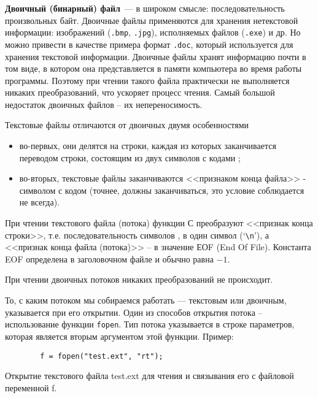 \textbf{Двоичный (бинарный) файл}~--- в широком смысле: последовательность произвольных байт. Двоичные файлы применяются для хранения нетекстовой информации: 
изображений (\verb|.bmp|, \verb|.jpg|), исполняемых файлов (\verb|.exe|) и др. Но можно привести в качестве примера формат \verb|.doc|, который используется для хранения текстовой информации. Двоичные 
файлы хранят информацию почти в том виде, в котором она представляется в памяти компьютера во время работы программы. Поэтому при чтении такого файла практически не 
выполняется никаких преобразований, что ускоряет процесс чтения. Самый большой недостаток двоичных файлов -- их непереносимость.

Текстовые файлы отличаются от двоичных двумя особенностями
\begin{itemize}
    \item во-первых, они делятся на строки, каждая из которых заканчивается переводом 
          строки, состоящим из двух символов с кодами ;
    \item во-вторых, текстовые файлы заканчиваются <<признаком конца файла>> - символом с кодом  (точнее, должны 
          заканчиваться, это условие соблюдается не всегда).
\end{itemize}

При чтении текстового файла (потока) функции С преобразуют <<признак конца строки>>, т.е. последовательность символов , в один символ 
(`\verb|\n|'), а <<признак конца файла (потока)>> -- в значение ЕОF (End Of File). Константа EOF определена в заголовочном файле  и обычно равна $-1$.

При чтении двоичных потоков никаких преобразований не происходит.

То, с каким потоком мы собираемся работать --- текстовым или двоичным, указывается при его открытии. Один из способов открытия потока -- использование функции \verb|fopen|. Тип потока указывается в строке параметров, которая является вторым аргументом этой функции. Пример:
\begin{listing}[H]
    \renewcommand{\listingscaption}{Листинг}
    \begin{verbatim}
        f = fopen("test.ext", "rt");
    \end{verbatim}
    \caption{Открытие текстового файла test.ext для чтения и связывания его с файловой переменной f.}
\end{listing}

